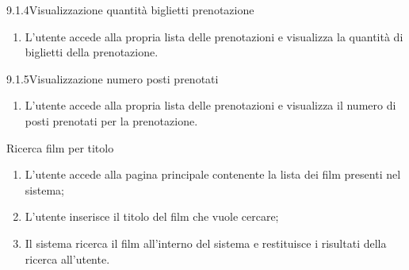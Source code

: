 \begin{usecase}{9.1.4}{Visualizzazione quantità biglietti prenotazione}\label{uc:lista-prenotazioni-singola-quantita}
  \usecasemain{}

  \begin{enumerate}
    \item L'utente accede alla propria lista delle prenotazioni e visualizza la quantità di biglietti della prenotazione.
  \end{enumerate}
\end{usecase}

\begin{usecase}{9.1.5}{Visualizzazione numero posti prenotati}\label{uc:lista-prenotazioni-singola-posti}
  \usecasemain{}

  \begin{enumerate}
    \item L'utente accede alla propria lista delle prenotazioni e visualizza il numero di posti prenotati per la prenotazione.
  \end{enumerate}
\end{usecase}

\begin{usecase}{10}{Ricerca film per titolo}\label{uc:ricerca-film}
  \usecasemain{}
  
  \begin{enumerate}
    \item L'utente accede alla pagina principale contenente la lista dei film presenti nel sistema;
    \item L'utente inserisce il titolo del film che vuole cercare;
    \item Il sistema ricerca il film all'interno del sistema e restituisce i risultati della ricerca all'utente.
  \end{enumerate}
\end{usecase}

